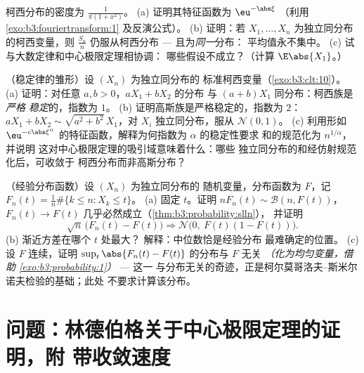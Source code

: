 \begin{exercise}[$\star\star$]\label{exo:b3:clt:10}
柯西分布的密度为 $\frac1{\pi(1 + x^2)}$。
(a) 证明其特征函数为 $\eu^{-\abs\xi}$
（利用\cref{exo:b3:fouriertransform:1} 及反演公式）。
(b) 证明：若 $X_1, \dots, X_n$ 为独立同分布的柯西变量，则
$\frac{S_n}n$ 仍服从柯西分布 --- 且为\emph{同一}分布：
平均值永不集中。
(c) 试与大数定律和中心极限定理相协调：
哪些假设不成立？（计算 $\E\abs{X_1}$。）
\end{exercise}

\begin{exercise}[$\star\star$]\label{exo:b3:clt:11}
（稳定律的雏形）设 $(X_n)$ 为独立同分布的
标准柯西变量（\cref{exo:b3:clt:10}）。
(a) 证明：对任意 $a, b > 0$，$aX_1 + bX_2$ 的分布
与 $(a + b)X_1$ 同分布：柯西族是 \emph{严格
稳定}的，指数为 $1$。
(b) 证明高斯族是严格稳定的，指数为
$2$：$aX_1 + bX_2 \sim \sqrt{a^2 + b^2}\,X_1$，对
$X_i$ 独立同分布，服从 $\mathcal N(0,1)$。
(c) 利用形如
$\eu^{-c\abs\xi^\alpha}$ 的特征函数，解释为何指数为 $\alpha$ 的稳定性要求
和的规范化为 $n^{1/\alpha}$，并说明
这对中心极限定理的吸引域意味着什么：哪些
独立同分布的和经仿射规范化后，可收敛于
柯西分布而非高斯分布？
\end{exercise}

\begin{exercise}[$\star\star$]\label{exo:b3:clt:12}
（经验分布函数）设 $(X_n)$ 为独立同分布的
随机变量，分布函数为 $F$，记 $F_n(t) =
\frac1n\#\{k \leq n : X_k \leq t\}$。
(a) 固定 $t$。证明 $n F_n(t) \sim \mathcal B(n, F(t))$，
$F_n(t) \to F(t)$ 几乎必然成立（\cref{thm:b3:probability:slln}），
并证明
\[
\sqrt n\,\bigl(F_n(t) - F(t)\bigr) \Longrightarrow
\mathcal N\bigl(0,\ F(t)(1 - F(t))\bigr) .
\]
(b) 渐近方差在哪个 $t$ 处最大？
解释：中位数恰是经验分布
最难确定的位置。
(c) 设 $F$ 连续，证明
$\sup_t\abs{F_n(t) - F(t)}$ 的分布与 $F$ 无关
\emph{（化为均匀变量，借助
\cref{exo:b3:probability:1}）} --- 这一
与分布无关的奇迹，正是柯尔莫哥洛夫--斯米尔诺夫检验的基础；此处
不要求计算该分布。
\end{exercise}

\section{问题：林德伯格关于中心极限定理的证明，附
带收敛速度}

